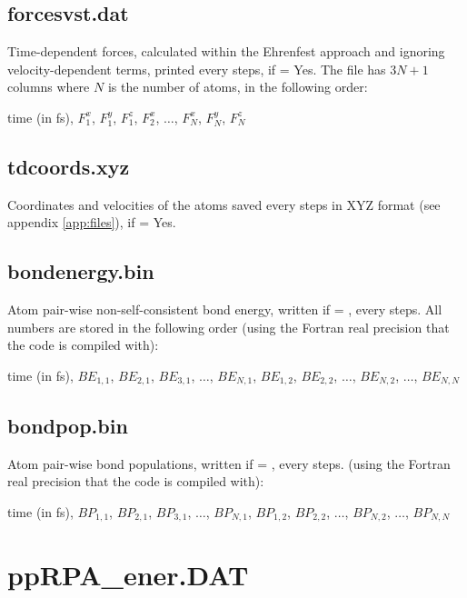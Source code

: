 \subsection{forcesvst.dat}

Time-dependent forces, calculated within the Ehrenfest approach and
ignoring velocity-dependent terms, printed every 
steps, if  = Yes. The file has $3N +1$ columns where $N$ is
the number of atoms, in the following order:

time (in fs), $F_1^x$, $F_1^y$, $F_1^z$, $F_2^x$, $\dots$, $F_N^x$,
$F_N^y$, $F_N^z$

\subsection{tdcoords.xyz}

Coordinates and velocities of the atoms saved every
 steps in XYZ format (see appendix
\ref{app:files}), if  = Yes.

\subsection{bondenergy.bin}
\label{sec:beformatout}

Atom pair-wise non-self-consistent bond energy, written if 
= , every  steps. All numbers are stored in the
following order (using the Fortran real precision that the code is compiled
with):

time (in fs), $BE_{1,1}$, $BE_{2,1}$, $BE_{3,1}$, $\dots$, $BE_{N,1}$,
$BE_{1,2}$, $BE_{2,2}$, $\dots$, $BE_{N,2}$, $\dots$, $BE_{N,N}$

\subsection{bondpop.bin}
\label{sec:bpformatout}

Atom pair-wise bond populations, written if  = ,
every  steps. (using the Fortran real precision that the code
is compiled with):

time (in fs), $BP_{1,1}$, $BP_{2,1}$, $BP_{3,1}$, $\dots$, $BP_{N,1}$,
$BP_{1,2}$, $BP_{2,2}$, $\dots$, $BP_{N,2}$, $\dots$, $BP_{N,N}$


\section{ppRPA\_ener.DAT}
\label{sec:ppRPAout}

